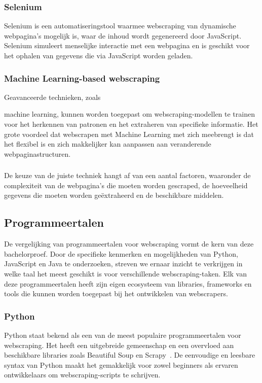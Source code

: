 \subsubsection{Selenium}
Selenium is een automatiseringstool waarmee webscraping van dynamische webpagina's mogelijk is, 
waar de inhoud wordt gegenereerd door JavaScript. Selenium simuleert menselijke interactie met een webpagina en is geschikt voor het ophalen van gegevens die via JavaScript worden geladen.

\subsubsection{Machine Learning-based webscraping}
Geavanceerde technieken, zoals 

machine learning, kunnen worden toegepast om webscraping-modellen te trainen voor het herkennen 
van patronen en het extraheren van specifieke informatie. Het grote voordeel dat webscrapen met Machine Learning met zich meebrengt
is dat het flexibel is en zich makkelijker kan aanpassen aan veranderende webpaginastructuren.

\subsubsection*{}
De keuze van de juiste techniek hangt af van een aantal factoren, waaronder de complexiteit van de webpagina's 
die moeten worden gescraped, de hoeveelheid gegevens die moeten worden geëxtraheerd en de beschikbare middelen.

\subsection{Programmeertalen}
De vergelijking van programmeertalen voor webscraping vormt de kern van deze bachelorproef. 
Door de specifieke kenmerken en mogelijkheden van Python, JavaScript en Java te onderzoeken, 
streven we ernaar inzicht te verkrijgen in welke taal het meest geschikt is voor verschillende webscraping-taken. 
Elk van deze programmeertalen heeft zijn eigen ecosysteem van libraries, frameworks en tools die kunnen worden toegepast 
bij het ontwikkelen van webscrapers.

\subsubsection{Python}
Python staat bekend als een van de meest populaire programmeertalen voor webscraping. Het heeft een uitgebreide gemeenschap en
een overvloed aan beschikbare libraries zoals Beautiful Soup en Scrapy~\autocite{Saabith2019}. De eenvoudige en leesbare syntax van Python maakt het 
gemakkelijk voor zowel beginners als ervaren ontwikkelaars om webscraping-scripts te schrijven.

